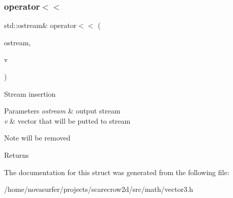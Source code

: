 \subsubsection{\texorpdfstring{operator$<$$<$}{operator<<}}
{\footnotesize\ttfamily std\+::ostream\& operator$<$$<$ (\begin{DoxyParamCaption}\item[{std\+::ostream \&}]{ostream,  }\item[{const \hyperlink{structmath_1_1vec3}{vec3} \&}]{v }\end{DoxyParamCaption})\hspace{0.3cm}{\ttfamily [friend]}}

Stream insertion 
\begin{DoxyParams}{Parameters}
{\em ostream} & output stream \\
\hline
{\em v} & vector that will be putted to stream \\
\hline
\end{DoxyParams}
\begin{DoxyNote}{Note}
will be removed 
\end{DoxyNote}
\begin{DoxyReturn}{Returns}

\end{DoxyReturn}


The documentation for this struct was generated from the following file\+:\begin{DoxyCompactItemize}
\item 
/home/novasurfer/projects/scarecrow2d/src/math/vector3.\+h\end{DoxyCompactItemize}
